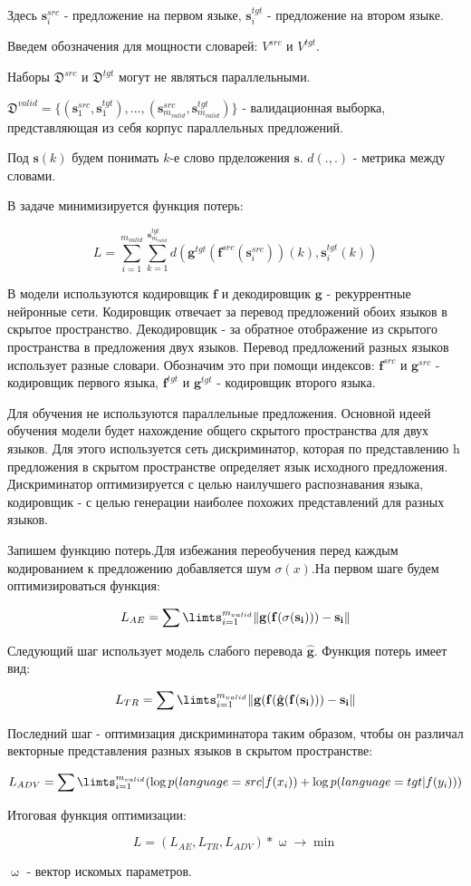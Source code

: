\documentclass[12pt,twoside]{article}
\begin{document}
Здесь $\mathbf{s}_i^{src}$ - предложение на первом языке, $\mathbf{s}_i^{tgt}$ - предложение на втором языке.

Введем обозначения для мощности словарей: $V^{src}$ и $V^{tgt}$.

Наборы $\mathfrak{D}^{src}$ и $\mathfrak{D}^{tgt}$ могут не являться параллельными.

$\mathfrak{D}^{valid}=\{(\mathbf{s}_1^{src},\mathbf{s}_1^{tgt}),...,(\mathbf{s}_{m_{valid}}^{src},\mathbf{s}_{m_{valid}}^{tgt})\}$ - валидационная выборка, представляющая из себя корпус параллельных предложений.

Под $\mathbf{s}(k)$ будем понимать $k$-е слово прделожения $\mathbf{s}$. $d(.,.)$ - метрика между словами.

В задаче минимизируется функция потерь:

$$L=\sum\limits_{i=1}^{m_{valid}}\sum\limits_{k=1}^{\mathbf{s}_{m_{valid}}^{tgt}}d(\mathbf{g}^{tgt}(\mathbf{f}^{src}(\mathbf{s}_{i}^{src}))(k),\mathbf{s}_i^{tgt}(k))$$

В модели используются кодировщик $\mathbf{f}$ и декодировщик $\mathbf{g}$ - рекуррентные нейронные сети. Кодировщик отвечает за перевод предложений обоих языков в скрытое пространство. Декодировщик - за обратное отображение из скрытого пространства в предложения двух языков.  Перевод предложений разных языков использует разные словари. Обозначим это при помощи индексов: $\mathbf{f}^{src}$ и $\mathbf{g}^{src}$ - кодировщик первого языка, $\mathbf{f}^{tgt}$ и $\mathbf{g}^{tgt}$ - кодировщик второго языка.

Для обучения не используются параллельные предложения. Основной идеей обучения модели будет нахождение общего скрытого пространства для двух языков. Для этого используется сеть дискриминатор, которая по представлению h предложения в скрытом пространстве определяет язык исходного предложения. Дискриминатор оптимизируется с целью наилучшего распознавания языка, кодировщик - с целью генерации наиболее похожих представлений для разных языков. 

Запишем функцию потерь.Для избежания переобучения перед каждым кодированием к предложению добавляется шум $\sigma(x)$.На первом шаге будем оптимизироваться функция:

$$L_{AE}=\sum\limts_{i=1}^{m_{valid}}\|\mathbf{g}(\mathbf{f}(\sigma(\mathbf{s_i}))) - \mathbf{s_i}\|$$

Следующий шаг использует модель слабого перевода $\hat{\mathbf{g}}$. Функция потерь имеет вид:

$$L_{TR}=\sum\limts_{i=1}^{m_{valid}}\|\mathbf{g}(\mathbf{f}(\hat{\mathbf{g}}(\mathbf{f}(\mathbf{s_i})))-\mathbf{s_i}\|$$
 
Последний шаг - оптимизация дискриминатора таким образом, чтобы он различал векторные представления разных языков в скрытом пространстве:

$$L_{ADV}=\sum\limts_{i=1}^{m_{valid}}(\log p(language=src|f(x_i))+\log p(language=tgt|f(y_i)))$$

Итоговая функция оптимизации:

$$L=(L_{AE},L_{TR},L_{ADV})*\upomega\rightarrow \min$$

$\upomega$ - вектор искомых параметров.


\end{document}
